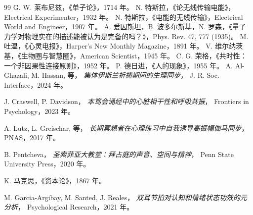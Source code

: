 \documentclass[12pt,a4paper]{article}
\begin{document}
	\begin{thebibliography}{99}
		 G. W. 莱布尼兹，《单子论》，1714 年。
		 N. 特斯拉，《论无线传输电能》，Electrical Experimenter，1932 年。
		 N. 特斯拉，《电能的无线传输》，Electrical World and Engineer，1907 年。
		 A. 爱因斯坦，B. 波多尔斯基，N. 罗森，《量子力学对物理实在的描述能被认为是完备的吗？》，Phys. Rev. 47, 777 (1935)。
		 M. 吐温，《心灵电报》，Harper's New Monthly Magazine，1891 年。
		 V. 维尔纳茨基，《生物圈与智慧圈》，American Scientist，1945 年。
		 C. G. 荣格，《共时性：一个非因果性连接原则》，1952 年。
		 P. 德日进，《人的现象》，1955 年。
		A. Al-Ghazali, M. Hassan, 等，
		\emph{集体伊斯兰祈祷期间的生理同步}，
		J. R. Soc. Interface，2024 年。
		
		J. Craswell, P. Davidson，
		\emph{本笃会诵经中的心脏相干性和呼吸共振}，
		Frontiers in Psychology，2023 年。
		
		A. Lutz, L. Greischar, 等，
		\emph{长期冥想者在心理练习中自我诱导高振幅伽马同步}，
		PNAS，2017 年。
		
		B. Pentcheva，
		\emph{圣索菲亚大教堂：拜占庭的声音、空间与精神}，
		Penn State University Press，2020 年。
		
		 K. 马克思，《资本论》，1867 年。
		
		M. Garcia‑Argibay, M. Santed, J. Reales，
		\emph{双耳节拍对认知和情绪状态功效的元分析}，
		Psychological Research，2021 年。
	\end{thebibliography}
	
\end{document}
